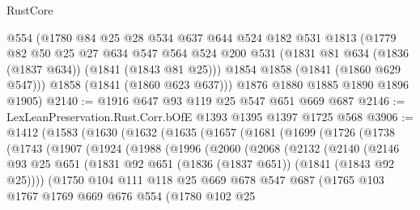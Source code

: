 \begin{lexlean}{RustCore}
\begin{coremodule}
      @554
      (@1780
        @84
        @25
        @28
        @534
        @637
        @644
        @524
        @182
        @531
        @1813
        (@1779
          @82
          @50
          @25
          @27
          @634
          @547
          @564
          @524
          @200
          @531
          (@1831 @81 @634 (@1836 (@1837 @634)) (@1841 (@1843 @81 @25)))
          @1854
          @1858
          (@1841 (@1860 @629 @547)))
        @1858
        (@1841 (@1860 @623 @637)))
      @1876
      @1880
      @1885
      @1890
      @1896
      @1905)
@2140 := @1916 @647 @93 @119 @25 @547 @651 @669 @687
@2146 := LexLeanPreservation.Rust.Corr.bOfE @1393 @1395 @1397 @1725 @568
@3906 := @1412
    (@1583
      (@1630
        (@1632
          (@1635
            (@1657
              (@1681
                (@1699
                  (@1726
                    (@1738
                      (@1743
                        (@1907
                          (@1924
                            (@1988
                              (@1996
                                (@2060
                                  (@2068
                                    (@2132
                                      (@2140
                                        (@2146
                                          @93
                                          @25
                                          @651
                                          (@1831
                                            @92
                                            @651
                                            (@1836 (@1837 @651))
                                            (@1841 (@1843 @92 @25))))
                                        (@1750
                                          @104
                                          @111
                                          @118
                                          @25
                                          @669
                                          @678
                                          @547
                                          @687
                                          (@1765
                                            @103
                                            @1767
                                            @1769
                                            @669
                                            @676
                                            @554
                                            (@1780
                                              @102
                                              @25

\end{coremodule}
\end{lexlean}

